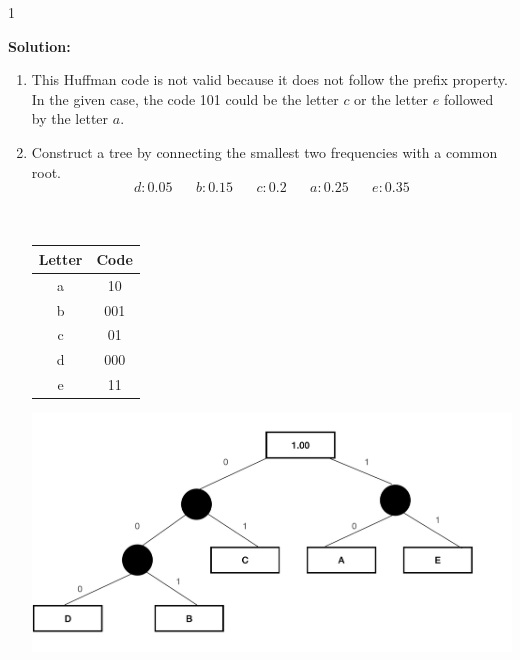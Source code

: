 \documentclass[9pt]{article}
\def\solutions{1}
\begin{document}
\if\solutions1
\vspace{2mm}

\textbf{Solution:} \\

\begin{enumerate}
    \item
        This Huffman code is not valid because it does not follow the prefix property. In the given case, the code 101 could be the letter $c$ or the letter $e$ followed by the letter $a$.    
    \item
        Construct a tree by connecting the smallest two frequencies with a common root.
        $$d:0.05 \phantom{......} b:0.15 \phantom{......} c:0.2 \phantom{......} a:0.25 \phantom{......} e:0.35$$ \\\\
    \begin{center}
    \begin{tabular}{c|c}
    Letter & Code \\ \hline
    a & 10 \\ 
    b & 001 \\
    c & 01 \\
    d & 000 \\
    e & 11
    \end{tabular}
    \end{center}
\newpage
\includegraphics[scale=0.5]{tree}
    
\end{enumerate}

\fi

\newpage
\end{document}

